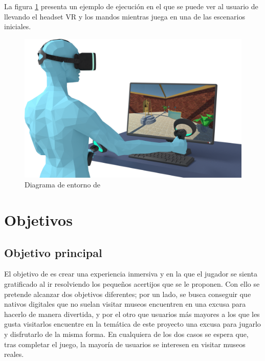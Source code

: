 La figura \ref{fig:entorno} presenta un ejemplo de ejecución en el que se puede ver al usuario de \MineRVa llevando el headset \acs{VR} y los mandos mientras juega en una de las escenarios iniciales.

\vspace{0.4cm}

\begin{figure}[!h]
\begin{center}
\includegraphics[width=1\textwidth]{imagenes/1/entorno-diffuse-2.png}
\caption{Diagrama de entorno de \MineRVa}
\label{fig:entorno}
\end{center}
\end{figure}

\section{Objetivos}

\subsection{Objetivo principal}

El objetivo de \MineRVa es crear una experiencia inmersiva y en la que el jugador se sienta gratificado al ir resolviendo los pequeños acertijos que se le proponen. Con ello se pretende alcanzar dos objetivos diferentes; por un lado, se busca conseguir que nativos digitales que no suelan visitar museos encuentren en \MineRVa una excusa para hacerlo de manera divertida, y por el otro que usuarios más mayores a los que les gusta visitarlos encuentre en la temática de este proyecto una excusa para jugarlo y disfrutarlo de la misma forma. En cualquiera de los dos casos se espera que, tras completar el juego, la mayoría de usuarios se interesen en visitar museos reales.

